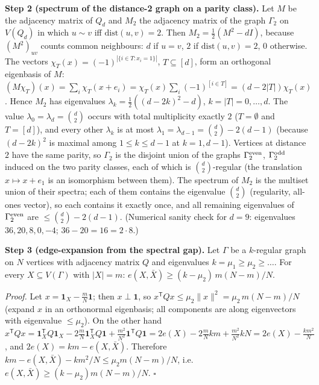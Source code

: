 \textbf{Step 2 (spectrum of the distance-2 graph on a parity class).}
Let \(M\) be the adjacency matrix of \(Q_d\) and \(M_2\) the adjacency
matrix of the graph \(\Gamma_2\) on \(V(Q_d)\) in which \(u\sim v\) iff
\(\mathrm{dist}(u,v)=2\). Then \(M_2=\tfrac12(M^2-dI)\), because
\((M^2)_{uv}\) counts common neighbours: \(d\) if \(u=v\), \(2\) if
\(\mathrm{dist}(u,v)=2\), \(0\) otherwise. The vectors
\(\chi_T(x)=(-1)^{|\{i\in T:x_i=1\}|}\), \(T\subseteq[d]\), form an
orthogonal eigenbasis of \(M\):
\((M\chi_T)(x)=\sum_i\chi_T(x+e_i)=\chi_T(x)\sum_i(-1)^{[i\in T]}=(d-2|T|)\chi_T(x)\).
Hence \(M_2\) has eigenvalues \(\lambda_k=\tfrac12((d-2k)^2-d)\),
\(k=|T|=0,\dots,d\). The value \(\lambda_0=\lambda_d=\binom d2\) occurs
with total multiplicity exactly \(2\) (\(T=\emptyset\) and \(T=[d]\)),
and every other \(\lambda_k\) is at most
\(\lambda_1=\lambda_{d-1}=\binom d2-2(d-1)\) (because \((d-2k)^2\) is
maximal among \(1\le k\le d-1\) at \(k=1,d-1\)). Vertices at distance
\(2\) have the same parity, so \(\Gamma_2\) is the disjoint union of the
graphs \(\Gamma_2^{\rm even}\), \(\Gamma_2^{\rm odd}\) induced on the
two parity classes, each of which is \(\binom d2\)-regular (the
translation \(x\mapsto x+e_1\) is an isomorphism between them). The
spectrum of \(M_2\) is the multiset union of their spectra; each of them
contains the eigenvalue \(\binom d2\) (regularity, all-ones vector), so
each contains it exactly once, and all remaining eigenvalues of
\(\Gamma_2^{\rm even}\) are \(\le\binom d2-2(d-1)\). (Numerical sanity
check for \(d=9\): eigenvalues \(36,20,8,0,-4\); \(36-20=16=2\cdot8\).)

\textbf{Step 3 (edge-expansion from the spectral gap).} Let \(\Gamma\)
be a \(k\)-regular graph on \(N\) vertices with adjacency matrix \(Q\)
and eigenvalues \(k=\mu_1\ge\mu_2\ge\dots\). For every
\(X\subseteq V(\Gamma)\) with \(|X|=m\):
\(e(X,\bar X)\ge(k-\mu_2)\,m(N-m)/N\).

\emph{Proof.} Let \(x=\mathbf 1_X-\tfrac mN\mathbf 1\); then
\(x\perp\mathbf 1\), so
\(x^{\mathsf T}Qx\le\mu_2\|x\|^2=\mu_2\,m(N-m)/N\) (expand \(x\) in an
orthonormal eigenbasis; all components are along eigenvectors with
eigenvalue \(\le\mu_2\)). On the other hand
\(x^{\mathsf T}Qx=\mathbf 1_X^{\mathsf T}Q\mathbf 1_X-2\tfrac mN\mathbf 1_X^{\mathsf T}Q\mathbf 1+\tfrac{m^2}{N^2}\mathbf 1^{\mathsf T}Q\mathbf 1=2e(X)-2\tfrac mN km+\tfrac{m^2}{N^2}kN=2e(X)-\tfrac{km^2}{N}\),
and \(2e(X)=km-e(X,\bar X)\). Therefore
\(km-e(X,\bar X)-km^2/N\le\mu_2 m(N-m)/N\),
i.e.~\(e(X,\bar X)\ge(k-\mu_2)m(N-m)/N\). \(\square\)


